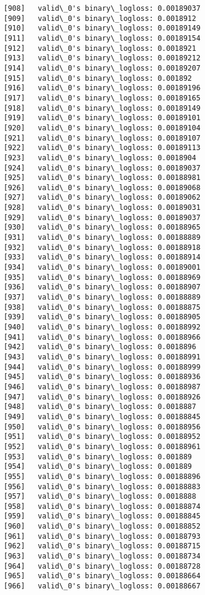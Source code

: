 \documentclass[11pt]{article}
\begin{document}
\begin{Verbatim}[commandchars=\\\{\}]
[908]	valid\_0's binary\_logloss: 0.00189037
[909]	valid\_0's binary\_logloss: 0.0018912
[910]	valid\_0's binary\_logloss: 0.00189149
[911]	valid\_0's binary\_logloss: 0.00189154
[912]	valid\_0's binary\_logloss: 0.0018921
[913]	valid\_0's binary\_logloss: 0.00189212
[914]	valid\_0's binary\_logloss: 0.00189207
[915]	valid\_0's binary\_logloss: 0.001892
[916]	valid\_0's binary\_logloss: 0.00189196
[917]	valid\_0's binary\_logloss: 0.00189165
[918]	valid\_0's binary\_logloss: 0.00189149
[919]	valid\_0's binary\_logloss: 0.00189101
[920]	valid\_0's binary\_logloss: 0.00189104
[921]	valid\_0's binary\_logloss: 0.00189107
[922]	valid\_0's binary\_logloss: 0.00189113
[923]	valid\_0's binary\_logloss: 0.0018904
[924]	valid\_0's binary\_logloss: 0.00189037
[925]	valid\_0's binary\_logloss: 0.00188981
[926]	valid\_0's binary\_logloss: 0.00189068
[927]	valid\_0's binary\_logloss: 0.00189062
[928]	valid\_0's binary\_logloss: 0.00189031
[929]	valid\_0's binary\_logloss: 0.00189037
[930]	valid\_0's binary\_logloss: 0.00188965
[931]	valid\_0's binary\_logloss: 0.00188889
[932]	valid\_0's binary\_logloss: 0.00188918
[933]	valid\_0's binary\_logloss: 0.00188914
[934]	valid\_0's binary\_logloss: 0.00189001
[935]	valid\_0's binary\_logloss: 0.00188969
[936]	valid\_0's binary\_logloss: 0.00188907
[937]	valid\_0's binary\_logloss: 0.00188889
[938]	valid\_0's binary\_logloss: 0.00188875
[939]	valid\_0's binary\_logloss: 0.00188905
[940]	valid\_0's binary\_logloss: 0.00188992
[941]	valid\_0's binary\_logloss: 0.00188966
[942]	valid\_0's binary\_logloss: 0.0018896
[943]	valid\_0's binary\_logloss: 0.00188991
[944]	valid\_0's binary\_logloss: 0.00188999
[945]	valid\_0's binary\_logloss: 0.00188936
[946]	valid\_0's binary\_logloss: 0.00188987
[947]	valid\_0's binary\_logloss: 0.00188926
[948]	valid\_0's binary\_logloss: 0.0018887
[949]	valid\_0's binary\_logloss: 0.00188845
[950]	valid\_0's binary\_logloss: 0.00188956
[951]	valid\_0's binary\_logloss: 0.00188952
[952]	valid\_0's binary\_logloss: 0.00188961
[953]	valid\_0's binary\_logloss: 0.001889
[954]	valid\_0's binary\_logloss: 0.001889
[955]	valid\_0's binary\_logloss: 0.00188896
[956]	valid\_0's binary\_logloss: 0.00188883
[957]	valid\_0's binary\_logloss: 0.0018888
[958]	valid\_0's binary\_logloss: 0.00188874
[959]	valid\_0's binary\_logloss: 0.00188845
[960]	valid\_0's binary\_logloss: 0.00188852
[961]	valid\_0's binary\_logloss: 0.00188793
[962]	valid\_0's binary\_logloss: 0.00188715
[963]	valid\_0's binary\_logloss: 0.00188734
[964]	valid\_0's binary\_logloss: 0.00188728
[965]	valid\_0's binary\_logloss: 0.00188664
[966]	valid\_0's binary\_logloss: 0.00188667

\end{Verbatim}
\end{document}
